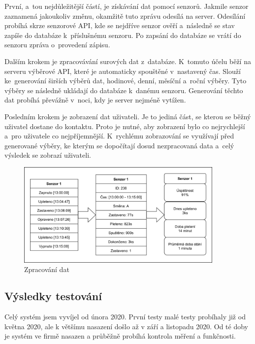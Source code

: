 \documentclass[12pt, a4paper]{article}
\begin{document}
První, a~tou nejdůležitější částí, je získávání dat pomocí senzorů.
Jakmile senzor zaznamená jakoukoliv změnu, okamžitě tuto zprávu odesílá na server.
Odesílání probíhá skrze senzorové API, kde se nejdříve senzor ověří a~následně se stav zapíše do databáze k~příslušnému senzoru.
Po zapsání do databáze se vrátí do senzoru zpráva o~provedení zápisu. 

Dalším krokem je zpracovávání surových dat z~databáze.
K~tomuto účelu běží na serveru výběrové API, které je automaticky spouštěné v~nastavený čas.
Slouží ke~generování širších výběrů dat, hodinové, denní, měsíční a~roční výběry.
Tyto výběry se následně ukládají do databáze k~danému senzoru.
Generování těchto dat probíhá převážně v~noci, kdy je server nejméně vytížen.

Posledním krokem je zobrazení dat uživateli.
Je to jediná část, se kterou se běžný uživatel dostane do kontaktu.
Proto je nutné, aby zobrazení bylo co nejrychlejší a~pro uživatele co nejpříjemnější.
K~rychlému zobrazování se využívají před generované výběry, ke kterým se dopočítají dosud nezpracovaná data a~celý výsledek se zobrazí uživateli.

\begin{figure}[t]
    \centering
    \includegraphics[width=0.9\textwidth]{img/Princip.png}
    \caption{Zpracování dat}
    \label{fig:princip}
\end{figure}


\subsection*{Výsledky testování}
Celý systém jsem vyvíjel od února 2020. První testy malé testy probíhaly již od května 2020, ale k většímu nasazení došlo až v září a listopadu 2020.
Od té doby je systém ve firmě nasazen a průběžně probíhá kontrola měření a funkčnosti.
\end{document}
